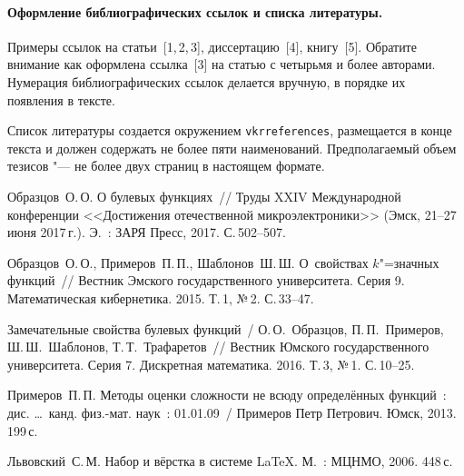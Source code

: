 \begin{vkrthesis}
\paragraph{Оформление библиографических ссылок и списка литературы.}
Примеры ссылок на статьи~[1,\,2,\,3], диссертацию~[4], книгу~[5].  Обратите
внимание как оформлена ссылка~[3] на статью с четырьмя и более авторами.
Нумерация библиографических ссылок делается вручную, в порядке их появления в
тексте.

Список литературы создается окружением \texttt {vkrreferences}, размещается в
конце текста и должен содержать не более пяти наименований.  Предполагаемый
объем тезисов "--- не более двух страниц в настоящем формате.

\begin{vkrreferences}
\item
Образцов~О.\,О. О булевых функциях~// Труды XXIV Международной конференции
<<Достижения отечественной микроэлектроники>> (Эмск, 21--27 июня 2017\,г.). Э.~:
ЗАРЯ Пресс, 2017. С.\,502--507.
\item
Образцов~О.\,О., Примеров~П.\,П., Шаблонов~Ш.\,Ш. О~свойствах
$k$"=значных функций~// Вестник Эмского государственного университета. Серия 9.
Математическая кибернетика. 2015. Т.\,1, №\,2. С.\,33--47.
\item
Замечательные свойства булевых функций~/ О.\,О.~Образцов, П.\,П.~Примеров,
Ш.\,Ш.~Шаблонов, Т.\,Т.~Трафаретов~// Вестник Юмского государственного
университета. Серия 7.  Дискретная математика. 2016. Т.\,3, №\,1.  С.\,10--25.
\item
Примеров~П.\,П. Методы оценки сложности не всюду определённых функций~: дис.
\ldots\ канд. физ.-мат. наук~: 01.01.09~/ Примеров Петр Петрович. Юмск, 2013.
199\,с.
\item
Львовский~С.\,М. Набор и вёрстка в системе \LaTeX. М.~: МЦНМО, 2006. 448\,с.
\end{vkrreferences}
\end{vkrthesis}
